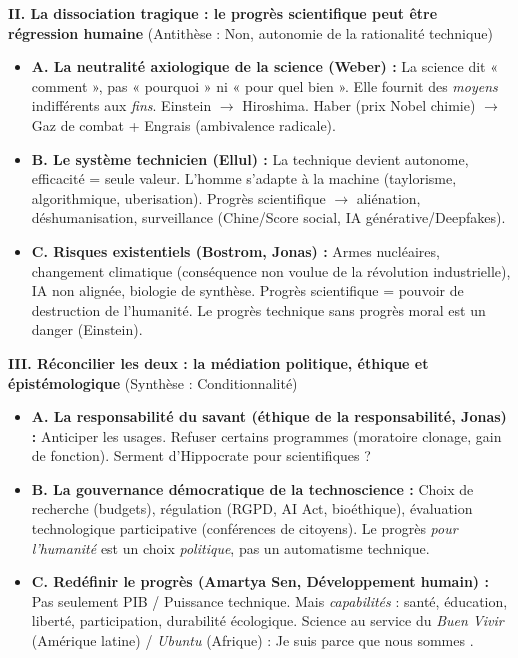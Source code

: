 \documentclass[11pt]{article}
\begin{document}
\begin{exoresolu}
    \textbf{II. La dissociation tragique : le progrès scientifique peut être régression humaine} (Antithèse : Non, autonomie de la rationalité technique)
    \begin{itemize}
        \item \textbf{A. La neutralité axiologique de la science (Weber) :} La science dit « comment », pas « pourquoi » ni « pour quel bien ». Elle fournit des \emph{moyens} indifférents aux \emph{fins}. Einstein $\rightarrow$ Hiroshima. Haber (prix Nobel chimie) $\rightarrow$ Gaz de combat + Engrais (ambivalence radicale).
        \item \textbf{B. Le système technicien (Ellul) :} La technique devient autonome, efficacité = seule valeur. L'homme s'adapte à la machine (taylorisme, algorithmique, uberisation). Progrès scientifique $\rightarrow$ aliénation, déshumanisation, surveillance (Chine/Score social, IA générative/Deepfakes).
        \item \textbf{C. Risques existentiels (Bostrom, Jonas) :} Armes nucléaires, changement climatique (conséquence non voulue de la révolution industrielle), IA non alignée, biologie de synthèse. Progrès scientifique = pouvoir de destruction de l'humanité. \guillemotleft Le progrès technique sans progrès moral est un danger \guillemotright (Einstein).
    \end{itemize}

    \textbf{III. Réconcilier les deux : la médiation politique, éthique et épistémologique} (Synthèse : Conditionnalité)
    \begin{itemize}
        \item \textbf{A. La responsabilité du savant (éthique de la responsabilité, Jonas) :} Anticiper les usages. Refuser certains programmes (moratoire clonage, gain de fonction). Serment d'Hippocrate pour scientifiques ?
        \item \textbf{B. La gouvernance démocratique de la technoscience :} Choix de recherche (budgets), régulation (RGPD, AI Act, bioéthique), évaluation technologique participative (conférences de citoyens). Le progrès \emph{pour l'humanité} est un choix \emph{politique}, pas un automatisme technique.
        \item \textbf{C. Redéfinir le progrès (Amartya Sen, Développement humain) :} Pas seulement PIB / Puissance technique. Mais \emph{capabilités} : santé, éducation, liberté, participation, durabilité écologique. Science au service du \emph{Buen Vivir} (Amérique latine) / \emph{Ubuntu} (Afrique) : \guillemotleft Je suis parce que nous sommes \guillemotright.
    \end{itemize}


\end{exoresolu}
\end{document}
